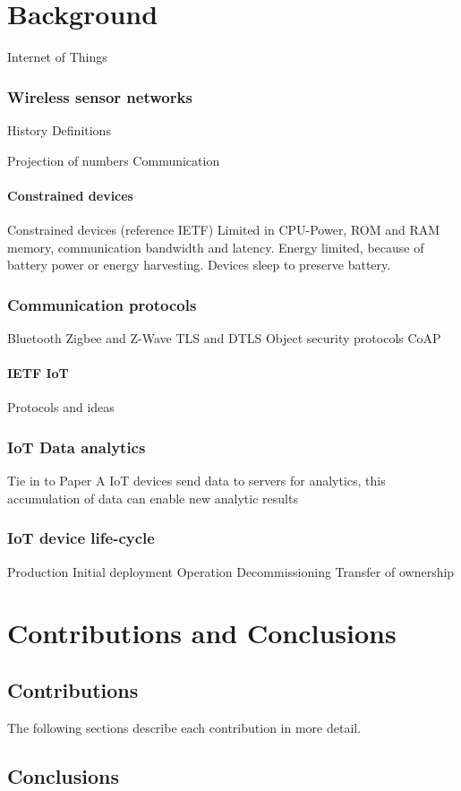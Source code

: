 \chapter{Background}
Internet of Things 
\subsection{Wireless sensor networks}
History
Definitions

Projection of numbers
Communication

\subsubsection{Constrained devices}
Constrained devices (reference IETF)
Limited in CPU-Power, ROM and RAM memory, communication bandwidth and latency. Energy limited, because of battery power or energy harvesting.
Devices sleep to preserve battery.
\cite{rfc7228}

\subsection{Communication protocols}
Bluetooth
Zigbee and Z-Wave
TLS and DTLS
Object security protocols
CoAP

\subsubsection{IETF IoT}
Protocols and ideas

\subsection{IoT Data analytics}
Tie in to Paper A
IoT devices send data to servers for analytics, this accumulation of data can enable new analytic results 

\subsection{IoT device life-cycle}
Production
Initial deployment
Operation
Decommissioning
Transfer of ownership

\chapter{Contributions and Conclusions}
\section{Contributions}
The following sections describe each contribution in more detail.

\subsection{\paperItitle}

\section{Conclusions}
\label{sec:kappa-conclusions}
{ \raggedright
\printbibliography[segment=\therefsegment,heading=bibintoc]
}
